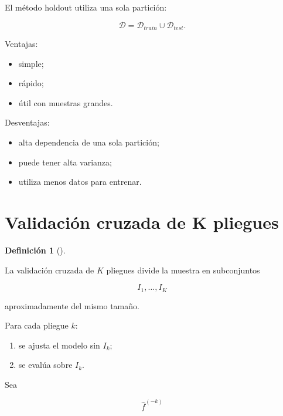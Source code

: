 \documentclass[
  spanish,
  10.5pt,
  letterpaper,
  DIV=11,
  numbers=noendperiod,
  oneside,
  open=any]{scrreprt}
\providecommand{\tightlist}{%
  \setlength{\itemsep}{0pt}\setlength{\parskip}{0pt}}
\theoremstyle{definition}
\newtheorem{definition}{Definición}[chapter]
\theoremstyle{definition}
\theoremstyle{plain}
\theoremstyle{remark}
\begin{document}

El método holdout utiliza una sola partición:

\[
\mathcal{D}
=
\mathcal{D}_{train}
\cup
\mathcal{D}_{test}.
\]

Ventajas:

\begin{itemize}
\tightlist
\item
  simple;
\item
  rápido;
\item
  útil con muestras grandes.
\end{itemize}

Desventajas:

\begin{itemize}
\tightlist
\item
  alta dependencia de una sola partición;
\item
  puede tener alta varianza;
\item
  utiliza menos datos para entrenar.
\end{itemize}

\section*{Validación cruzada de K
pliegues}\label{validaciuxf3n-cruzada-de-k-pliegues}


\begin{definition}[]\protect\hypertarget{def-validacion-cruzada}{}\label{def-validacion-cruzada}

La validación cruzada de \(K\) pliegues divide la muestra en
subconjuntos

\[
I_1,\ldots,I_K
\]

aproximadamente del mismo tamaño.

\end{definition}

Para cada pliegue \(k\):

\begin{enumerate}
\def\labelenumi{\arabic{enumi}.}
\tightlist
\item
  se ajusta el modelo sin \(I_k\);
\item
  se evalúa sobre \(I_k\).
\end{enumerate}

Sea

\[
\widehat{f}^{(-k)}
\]
\end{document}
